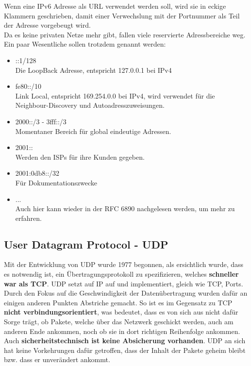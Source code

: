 \documentclass[12pt,a4paper]{report}
\begin{document}
\begin{onehalfspace}
Wenn eine IPv6 Adresse als URL verwendet werden soll, wird sie in eckige Klammern geschrieben, damit einer Verwechslung mit der Portnummer als Teil der Adresse vorgebeugt wird.\\

Da es keine privaten Netze mehr gibt, fallen viele reservierte Adressbereiche weg. Ein paar Wesentliche sollen trotzdem genannt werden:
\begin{itemize}
\item ::1/128\\
Die LoopBack Adresse, entspricht 127.0.0.1 bei IPv4
\item fe80::/10\\
Link Local, entspricht 169.254.0.0 bei IPv4, wird verwendet für die Neighbour-Discovery und Autoadresszuweisungen.
\item 2000::/3 - 3fff::/3\\
Momentaner Bereich für global eindeutige Adressen.
\item 2001::\\
Werden den ISPs für ihre Kunden gegeben.
\item 2001:0db8::/32\\
Für Dokumentationszwecke
\item ...\\
Auch hier kann wieder in der RFC 6890 nachgelesen werden, um mehr zu erfahren.
\end{itemize}
\subsection{User Datagram Protocol - UDP}
Mit der Entwicklung von UDP wurde 1977 begonnen, als ersichtlich wurde, dass es notwendig ist, ein Übertragungsprotokoll zu spezifizieren, welches \textbf{schneller war als TCP}. UDP setzt auf IP auf und implementiert, gleich wie TCP, Ports.\\

Durch den Fokus auf die Geschwindigkeit der Datenübertragung wurden dafür an einigen anderen Punkten Abstriche gemacht. So ist es im Gegensatz zu TCP \textbf{nicht verbindungsorientiert}, was bedeutet, dass es von sich aus nicht dafür Sorge trägt, ob Pakete, welche über das Netzwerk geschickt werden, auch am anderen Ende ankommen, noch ob sie in dort richtigen Reihenfolge ankommen.\\
Auch \textbf{sicherheitstechnisch ist keine Absicherung vorhanden}. UDP an sich hat keine Vorkehrungen dafür getroffen, dass der Inhalt der Pakete geheim bleibt bzw. dass er unverändert ankommt.\\


\end{onehalfspace}
\end{document}
